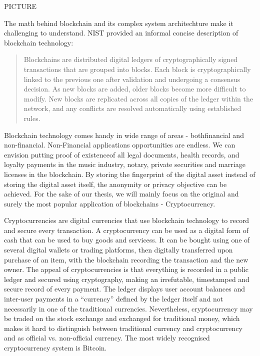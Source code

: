 PICTURE

The math behind blockchain and its complex system architechture make it challenging to understand. 
NIST provided an informal concise description of blockchain technology:

\begin{quote} 
Blockchains are distributed digital ledgers of cryptographically signed transactions that are grouped into blocks. 
Each block is cryptographically linked to the previous one after validation and undergoing a consensus decision. 
As new blocks are added, older blocks become more difficult to modify. 
New blocks are replicated across all copies of the ledger within the network, and any conflicts are resolved automatically using established rules. 
\end{quote}

Blockchain technology comes handy in wide range of areas - both ​financial​ and non-financial​. 
Non-Financial​ applications opportunities are endless. 
We can envision putting proof of existenceof all legal documents, health records, and loyalty payments in the music industry, notary, private securities and marriage licenses in the blockchain. 
By storing the fingerprint of the digital asset instead of storing the digital asset itself, the anonymity or privacy objective can be achieved.
For the sake of our thesis, we will mainly focus on the original and surely the most popular application of blockchains - Cryptocurrency.

Cryptocurrencies are digital currencies that use blockchain technology to record and secure every transaction. 
A cryptocurrency can be used as a digital form of cash that can be used to buy goods and servicess. 
It can be bought using one of several digital wallets or trading platforms, then digitally transferred upon purchase of an item, with the blockchain recording the transaction and the new owner. 
The appeal of cryptocurrencies is that everything is recorded in a public ledger and secured using cryptography, making an irrefutable, timestamped and secure record of every payment.
The ledger displays user account balances and inter-user payments in a “currency” defined by the ledger itself and not necessarily in one of the traditional currencies. 
Nevertheless, cryptocurrency may be traded on the stock exchange and exchanged for traditional money, which makes it hard to distinguish between traditional currency and cryptocurrency and as official vs. non-official currency. 
The most widely recognised cryptocurrency system is Bitcoin.

